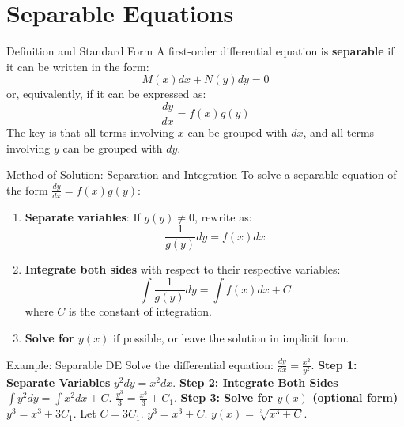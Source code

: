 \documentclass[10pt,aspectratio=169]{beamer}
\begin{document}
\section{Separable Equations}

\begin{frame}{Definition and Standard Form}
    A first-order differential equation is \textbf{separable} if it can be written in the form:
    \begin{equation}
        M(x)dx + N(y)dy = 0
        \label{eq:separable_form1}
    \end{equation}
    or, equivalently, if it can be expressed as:
    \begin{equation}
        \frac{dy}{dx} = f(x)g(y)
        \label{eq:separable_form2}
    \end{equation}
    The key is that all terms involving $x$ can be grouped with $dx$, and all terms involving $y$ can be grouped with $dy$.
\end{frame}

\begin{frame}{Method of Solution: Separation and Integration}
    To solve a separable equation of the form $\frac{dy}{dx} = f(x)g(y)$:
    \begin{enumerate}
        \item \textbf{Separate variables}: If $g(y) \neq 0$, rewrite as:
        \begin{equation}
            \frac{1}{g(y)}dy = f(x)dx
        \end{equation}
        \item \textbf{Integrate both sides} with respect to their respective variables:
        \begin{equation}
            \int \frac{1}{g(y)}dy = \int f(x)dx + C
            \label{eq:separable_solution}
        \end{equation}
        where $C$ is the constant of integration.
        \item \textbf{Solve for $y(x)$} if possible, or leave the solution in implicit form.
    \end{enumerate}
\end{frame}

\begin{frame}{Example: Separable DE}
    Solve the differential equation: $\frac{dy}{dx} = \frac{x^2}{y^2}$.
    \vspace{1em}
    \textbf{Step 1: Separate Variables}
    $y^2 dy = x^2 dx$.
    \vspace{1em}
    \textbf{Step 2: Integrate Both Sides}
    $\int y^2 dy = \int x^2 dx + C$.
    $\frac{y^3}{3} = \frac{x^3}{3} + C_1$.
    \vspace{1em}
    \textbf{Step 3: Solve for $y(x)$ (optional form)}
    $y^3 = x^3 + 3C_1$. Let $C = 3C_1$.
    $y^3 = x^3 + C$.
    $y(x) = \sqrt[3]{x^3 + C}$.
\end{frame}
\end{document}
